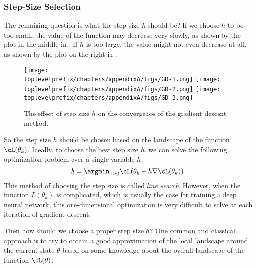 \documentclass[../../book-main.tex]{subfiles}
\begin{document}
\subsubsection{Step-Size Selection}

The remaining question is what the step size $h$ should be? If we choose $h$ to be too small, the value of the function may decrease very slowly, as shown by the plot in the middle in . If $h$ is too large, the value might not even decrease at all, as shown by the plot on the right in .

\begin{figure}[h]
    \centering
    \texttt{[image: \\toplevelprefix/chapters/appendixA/figs/GD-1.png]}
    \hspace{3mm}
    \texttt{[image: \\toplevelprefix/chapters/appendixA/figs/GD-2.png]}
    \hspace{3mm}
    \texttt{[image: \\toplevelprefix/chapters/appendixA/figs/GD-3.png]}
    \caption{The effect of step size $h$ on the convergence of the gradient descent method.}
    \label{fig:step-size}
\end{figure}

So the step size $h$ should be chosen based on the landscape of the function $\cL(\theta_k)$. Ideally, to choose the best step size $h$, we can solve the following optimization problem over a single variable $h$:
\begin{equation}
    h = \argmin_{h\geq 0} \cL(\theta_k - h\nabla \cL(\theta_k)).
\end{equation}
This method of choosing the step size is called \textit{line search}. However, when the function $L(\theta_k)$ is complicated, which is usually the case for training a deep neural network, this one-dimensional optimization is very difficult to solve at each iteration of gradient descent. 

Then how should we choose a proper step size $h$? One common and classical approach is to try to obtain a good approximation of the local landscape around the current state $\theta$ based on some knowledge about the overall landscape of the function $\cL(\theta)$. 
\end{document}
